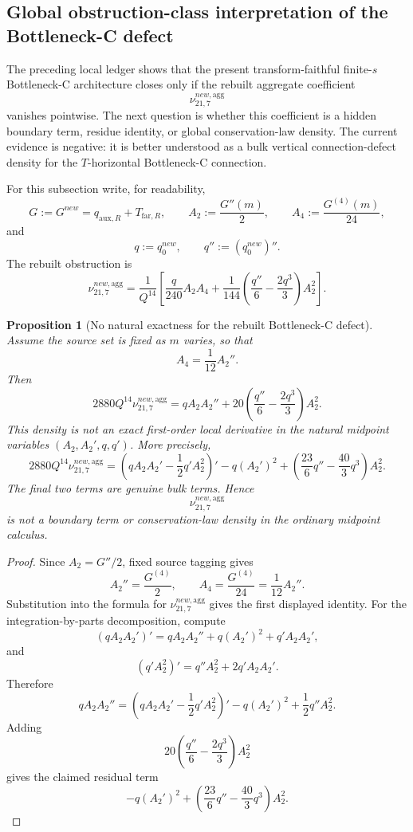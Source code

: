 \documentclass[11pt,a4paper]{amsart}
\def\new{new}%
\theoremstyle{plain}
\newtheorem{proposition}[theorem]{Proposition}
\theoremstyle{definition}
\newcommand{\new}{\mathrm{new}}
\begin{document}
\subsection{Global obstruction-class interpretation of the Bottleneck-C defect}
\label{subsec:global-obstruction-class-bottleneck-c-defect}

The preceding local ledger shows that the present transform-faithful
finite-\(s\) Bottleneck-C architecture closes only if the rebuilt aggregate
coefficient
\[
\nu_{21,7}^{\new,\mathrm{agg}}
\]
vanishes pointwise.  The next question is whether this coefficient is a hidden
boundary term, residue identity, or global conservation-law density.  The
current evidence is negative: it is better understood as a bulk vertical
connection-defect density for the \(T\)-horizontal Bottleneck-C connection.

For this subsection write, for readability,
\[
G:=G^{\new}=q_{\mathrm{aux},R}+T_{\mathrm{far},R},
\qquad
A_2:=\frac{G''(m)}{2},
\qquad
A_4:=\frac{G^{(4)}(m)}{24},
\]
and
\[
q:=q_0^{\new},
\qquad
q'':=(q_0^{\new})''.
\]
The rebuilt obstruction is
\[
\nu_{21,7}^{\new,\mathrm{agg}}
=
\frac{1}{Q^{14}}
\left[
\frac{q}{240}A_2A_4
+
\frac{1}{144}
\left(
\frac{q''}{6}
-
\frac{2q^3}{3}
\right)
A_2^2
\right].
\]

\begin{proposition}[No natural exactness for the rebuilt Bottleneck-C defect]
\label{prop:no-natural-exactness-rebuilt-bc-defect}
Assume the source set is fixed as \(m\) varies, so that
\[
A_4=\frac{1}{12}A_2''.
\]
Then
\[
2880Q^{14}\nu_{21,7}^{\new,\mathrm{agg}}
=
qA_2A_2''
+
20
\left(
\frac{q''}{6}
-
\frac{2q^3}{3}
\right)
A_2^2.
\]
This density is not an exact first-order local derivative in the natural
midpoint variables \((A_2,A_2',q,q')\).  More precisely,
\[
2880Q^{14}\nu_{21,7}^{\new,\mathrm{agg}}
=
\left(
qA_2A_2'
-
\frac12 q'A_2^2
\right)'
-
q(A_2')^2
+
\left(
\frac{23}{6}q''
-
\frac{40}{3}q^3
\right)
A_2^2.
\]
The final two terms are genuine bulk terms.  Hence
\[
\nu_{21,7}^{\new,\mathrm{agg}}
\]
is not a boundary term or conservation-law density in the ordinary midpoint
calculus.
\end{proposition}

\begin{proof}
Since \(A_2=G''/2\), fixed source tagging gives
\[
A_2''=\frac{G^{(4)}}{2},
\qquad
A_4=\frac{G^{(4)}}{24}=\frac{1}{12}A_2''.
\]
Substitution into the formula for
\(\nu_{21,7}^{\new,\mathrm{agg}}\) gives the first displayed identity.
For the integration-by-parts decomposition, compute
\[
(qA_2A_2')'
=
qA_2A_2''
+
q(A_2')^2
+
q'A_2A_2',
\]
and
\[
(q'A_2^2)'=q''A_2^2+2q'A_2A_2'.
\]
Therefore
\[
qA_2A_2''
=
\left(
qA_2A_2'
-
\frac12q'A_2^2
\right)'
-
q(A_2')^2
+
\frac12q''A_2^2.
\]
Adding
\[
20
\left(
\frac{q''}{6}
-
\frac{2q^3}{3}
\right)A_2^2
\]
gives the claimed residual term
\[
-q(A_2')^2
+
\left(
\frac{23}{6}q''
-
\frac{40}{3}q^3
\right)A_2^2.
\]
\end{proof}
\end{document}
